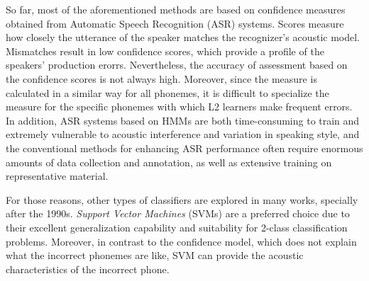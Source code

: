 So far, most of the aforementioned methods are based on confidence measures 
obtained from Automatic Speech Recognition (ASR) systems. 
Scores measure how closely the utterance of the speaker matches the recognizer's
acoustic model. Mismatches result in low confidence scores, which provide a profile of the 
speakers' production erorrs. Nevertheless, the accuracy of assessment based on the
confidence scores is not always high. Moreover, since the measure is calculated in a similar
way for all phonemes, it is difficult to specialize the measure for the specific 
phonemes with which L2 learners make frequent errors. In addition,
ASR systems based on HMMs are both time-consuming to train and extremely vulnerable to
acoustic interference and variation in speaking style, and the conventional methods for
enhancing ASR performance often require enormous amounts of data collection and annotation,
as well as extensive training on representative material.

For those reasons, other types of classifiers are explored in many works, specially after
the 1990s. \textit{Support Vector Machines} (SVMs) are a preferred choice 
due to their excellent generalization capability and suitability for 2-class classification
problems. Moreover, in contrast to the confidence model, which does not explain what the
incorrect phonemes are like, SVM can provide the acoustic characteristics of the incorrect phone.

